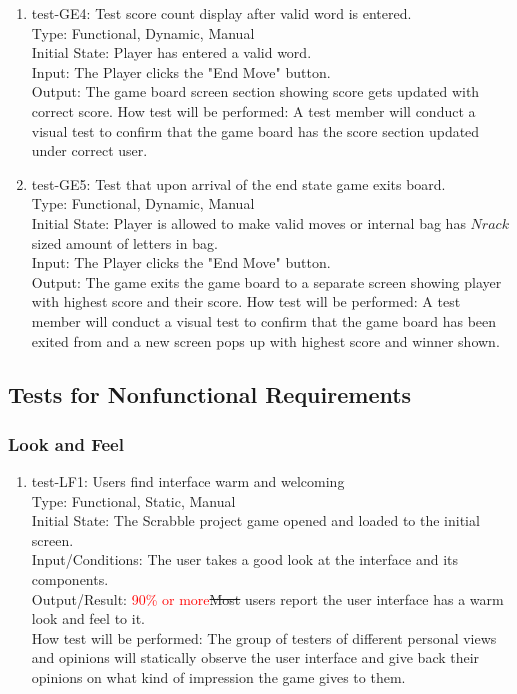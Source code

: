 \documentclass[12pt, titlepage]{article}
\begin{document}
\begin{enumerate}
    \item{test-GE4: Test score count display after valid word is entered.\\} %
    Type: Functional, Dynamic, Manual\\
    Initial State: Player has entered a valid word. \\
    Input: The Player clicks the "End Move" button.\\
    Output: The game board screen section showing score gets updated with correct score.
    How test will be performed: A test member will conduct a visual test to confirm that the game board has the score section updated under correct user.\\
    
    \item{test-GE5: Test that upon arrival of the end state game exits board.\\} %
    Type: Functional, Dynamic, Manual\\
    Initial State: Player is allowed to make valid moves or internal bag has $N rack$ sized amount of letters in bag. \\
    Input: The Player clicks the "End Move" button.\\
    Output: The game exits the game board to a separate screen showing player with highest score and their score.
    How test will be performed: A test member will conduct a visual test to confirm that the game board has been exited from and a new screen pops up with highest score and winner shown.\\
\end{enumerate}
    
\subsection{Tests for Nonfunctional Requirements}%

\subsubsection{Look and Feel}
\begin{enumerate}

\item{test-LF1: Users find interface warm and welcoming}\\
    Type: Functional, Static, Manual\\
    Initial State: The Scrabble project game opened and loaded to the initial screen.\\
    Input/Conditions: The user takes a good look at the interface and its components.\\
    Output/Result: \textcolor{red}{90\% or more}\sout{Most} users report the user interface has a warm look and feel to it.\\
    How test will be performed: The group of testers of different personal views and opinions will statically observe the user interface and give back their opinions on what kind of impression the game gives to them.\\
\end{enumerate}
\end{document}
